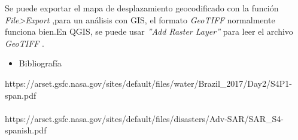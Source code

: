 \documentclass{article}
\begin{document}
    Se puede exportar el mapa de desplazamiento geocodificado con la función \textit{File>Export} ,para un análisis con GIS, el formato \textit{GeoTIFF}  normalmente funciona bien.En QGIS, se puede usar \textit{”Add Raster Layer”} para leer el archivo \textit{GeoTIFF} .
    \begin{itemize}
        \item Bibliografía
    \end{itemize}
    
    https://arset.gsfc.nasa.gov/sites/default/files/water/Brazil_2017/Day2/S4P1-span.pdf \\ \\
    
    https://arset.gsfc.nasa.gov/sites/default/files/disasters/Adv-SAR/SAR_S4-spanish.pdf
    
\end{document}
